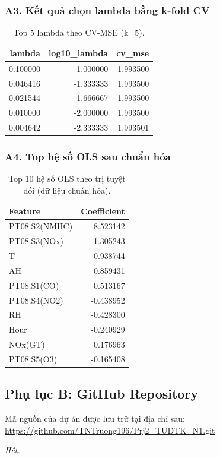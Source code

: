 \documentclass[a4paper]{article}
\begin{document}
\subsubsection*{A3. Kết quả chọn lambda bằng k-fold CV}
\begin{table}[H]
    \centering
    \small
    \begin{tabular}{rrr}
    \toprule
    lambda & log10\_lambda & cv\_mse \\
    \midrule
    0.100000 & -1.000000 & 1.993500 \\
    0.046416 & -1.333333 & 1.993500 \\
    0.021544 & -1.666667 & 1.993500 \\
    0.010000 & -2.000000 & 1.993500 \\
    0.004642 & -2.333333 & 1.993501 \\
    \bottomrule
    \end{tabular}
    \caption{Top 5 lambda theo CV-MSE (k=5).}
\end{table}

\subsubsection*{A4. Top hệ số OLS sau chuẩn hóa}
\begin{table}[H]
    \centering
    \small
    \begin{tabular}{lr}
    \toprule
    Feature & Coefficient \\
    \midrule
    PT08.S2(NMHC) & 8.523142 \\
    PT08.S3(NOx) & 1.305243 \\
    T & -0.938744 \\
    AH & 0.859431 \\
    PT08.S1(CO) & 0.513167 \\
    PT08.S4(NO2) & -0.438952 \\
    RH & -0.428300 \\
    Hour & -0.240929 \\
    NOx(GT) & 0.176963 \\
    PT08.S5(O3) & -0.165408 \\
    \bottomrule
    \end{tabular}
    \caption{Top 10 hệ số OLS theo trị tuyệt đối (dữ liệu chuẩn hóa).}
\end{table}



\subsection*{Phụ lục B: GitHub Repository}

Mã nguồn của dự án được lưu trữ tại địa chỉ sau: 
\url{https://github.com/TNTruong196/Prj2_TUDTK_N1.git}

\centering
\textit{Hết.}
\end{document}
